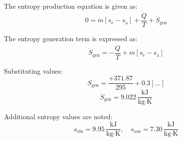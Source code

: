 The entropy production equation is given as:  
\[
0 = \dot{m} \left[ s_{\text{e}} - s_{\text{a}} \right] + \frac{\dot{Q}}{T} + \dot{S}_{\text{gen}}
\]  

The entropy generation term is expressed as:  
\[
\dot{S}_{\text{gen}} = -\frac{\dot{Q}}{T} + \dot{m} \left[ s_{\text{e}} - s_{\text{a}} \right]
\]  

Substituting values:  
\[
\dot{S}_{\text{gen}} = \frac{+371.87}{295} + 0.3 \left[ \ldots \right]
\]  
\[
\dot{S}_{\text{gen}} = 9.022 \, \frac{\text{kJ}}{\text{kg·K}}
\]  

Additional entropy values are noted:  
\[
s_{\text{ein}} = 9.95 \, \frac{\text{kJ}}{\text{kg·K}}, \quad s_{\text{aus}} = 7.30 \, \frac{\text{kJ}}{\text{kg·K}}
\]